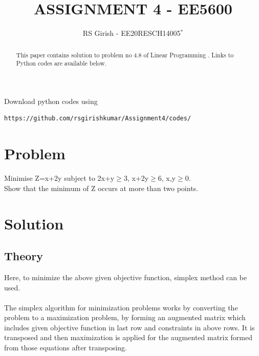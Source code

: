 \documentclass[journal,12pt,twocolumn]{IEEEtran}
\begin{document}
\makeatletter
{}
\makeatother
\let\StandardTheFigure\thefigure
\let\vec\mathbf
\renewcommand{\thefigure}{\theproblem}
\def\putbox#1#2#3{\makebox[0in][l]{\makebox[#1][l]{}\raisebox{\baselineskip}[0in][0in]{\raisebox{#2}[0in][0in]{#3}}}}
     \def\rightbox#1{\makebox[0in][r]{#1}}
     \def\centbox#1{\makebox[0in]{#1}}
     \def\topbox#1{\raisebox{-\baselineskip}[0in][0in]{#1}}
     \def\midbox#1{\raisebox{-0.5\baselineskip}[0in][0in]{#1}}
\vspace{3cm}
\title{
ASSIGNMENT 4 - EE5600
	}
\author{ RS Girish - EE20RESCH14005$^{*}$%
	}	

\maketitle
\newpage
\tableofcontents
\bigskip
\renewcommand{\thefigure}{\theenumi}
\renewcommand{\thetable}{\theenumi}

\begin{abstract}
This paper contains solution to problem no 4.8 of Linear Programming .
Links to Python codes are available below.  
\end{abstract}
Download python codes using 
\begin{lstlisting}
https://github.com/rsgirishkumar/Assignment4/codes/
\end{lstlisting}
\section{Problem}
Minimise Z=x+2y
subject to 2x+y$\geq$3, x+2y$\geq$6, x,y$\geq$0.\\
Show that the minimum of Z occurs at more than two points.\\
\section{Solution}
\subsection{Theory}
Here, to minimize the above given objective function, simplex method can be used.\\
\\
The simplex algorithm for minimization problems works by converting the problem to a maximization problem, by forming an augmented matrix which includes given objective function in last row and constraints in above rows. It is transposed and then maximization is applied for the augmented matrix formed from those equations after transposing.
\\
\end{document}
